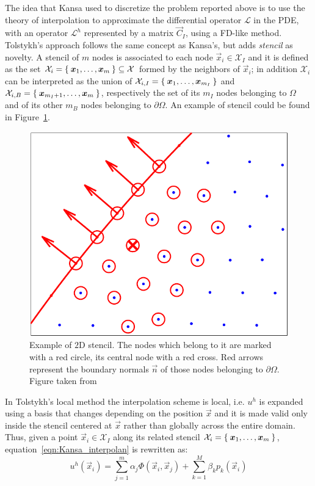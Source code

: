 The idea that Kansa used to discretize the problem reported above is to use the theory of interpolation to approximate the differential operator $\mathcal{L}$ in the PDE, with an operator $\mathcal{L}^h$ represented by a matrix $\vec{C}_I$, using a FD-like method.
Tolstykh's approach follows the same concept as Kansa's, but adds \emph{stencil} as novelty. A stencil of $m$ nodes is associated to each node $\vec{x}_i \in \mathcal{X}_I$ and it is defined as the set $\mathcal{X}_i = \Set{\boldsymbol{x}_1, \dots, \boldsymbol{x}_m} \subseteq \mathcal{X}$ formed by the neighbors of $\vec{x}_i$; in addition $\mathcal{X}_i$ can be interpreted as the union of $\mathcal{X}_{i,I} = \Set{\boldsymbol{x}_1, \dots, \boldsymbol{x}_{m_I}}$ and $\mathcal{X}_{i,B} = \Set{\boldsymbol{x}_{m_I+1}, \dots, \boldsymbol{x}_m}$, respectively the set of its $m_I$ nodes belonging to $\Omega$ and of its other $m_B$ nodes belonging to $\partial\Omega$. An example of stencil could be found in Figure~\ref{fig:2D_stencil}.

\begin{figure}
\centering
\includegraphics[width=.5\textwidth]{img/2D_stencil}
\caption{Example of $2$D stencil. The nodes which belong to it are marked with a red circle, its central node with a red cross. Red arrows represent the boundary normals $\vec{n}$ of those nodes belonging to $\partial\Omega$. Figure taken from~\cite{Miotti:phd_thesis}} 
\label{fig:2D_stencil}
\end{figure}

In Tolstykh's local method the interpolation scheme is local, i.e. $u^h$ is expanded using a basis that changes depending on the position $\vec{x}$ and it is made valid only inside the stencil centered at $\vec{x}$ rather than globally across the entire domain. Thus, given a point $\vec{x}_i \in \mathcal{X}_I$ along its related stencil $\mathcal{X}_i = \Set{\boldsymbol{x}_1, \dots, \boldsymbol{x}_m}$, equation~\eqref{eqn:Kansa_interpolan} is rewritten as:
\begin{equation}
	\label{eqn:local_RBF-FD_interpolant}
	u^h(\vec{x}_i) = \sum_{j=1}^{m} \alpha_j \Phi(\vec{x}_i, \vec{x}_j) + \sum_{k=1}^{M} \beta_k p_k(\vec{x}_i)
\end{equation}

